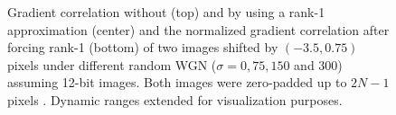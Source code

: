 \begin{figure}[htpb]
\caption{Gradient correlation without (top) and by using a rank-1 approximation (center) and the normalized gradient correlation after forcing rank-1 (bottom) of two images shifted by $(-3.5, 0.75)$ pixels under different random WGN ($\sigma=0,75,150$ and $300$) assuming 12-bit images. Both images were zero-padded up to $2N-1$ pixels \cite{Tzimiropoulos2016}. Dynamic ranges extended for visualization purposes.}
\label{fig:gradientCorrelation}
\end{figure}







